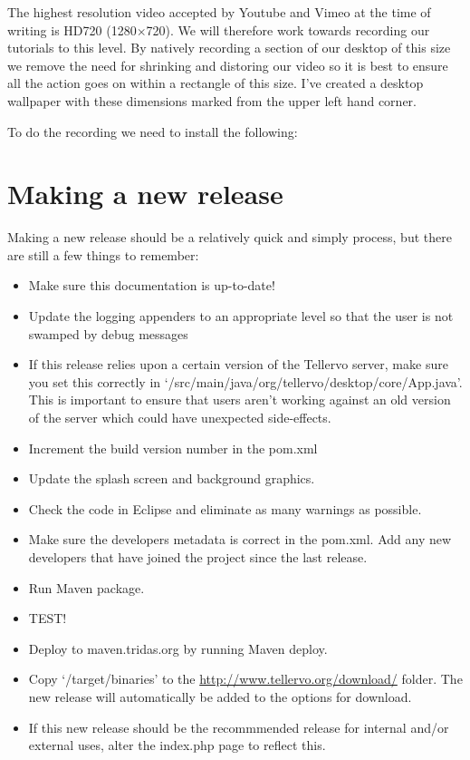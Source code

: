 The highest resolution video accepted by Youtube and Vimeo at the time of writing is HD720 (1280$\times$720).  We will therefore work towards recording our tutorials to this level.  By natively recording a section of our desktop of this size we remove the need for shrinking and distoring our video so it is best to ensure all the action goes on within a rectangle of this size.  I've created a desktop wallpaper with these dimensions marked from the upper left hand corner.  

To do the recording we need to install the following:




\section{Making a new release}
Making a new release should be a relatively quick and simply process, but there are still a few things to remember:

\begin{itemize}
 \item Make sure this documentation is up-to-date!  
 \item Update the logging appenders to an appropriate level so that the user is not swamped by debug messages
 \item If this release relies upon a certain version of the Tellervo server, make sure you set this correctly in `/src/main/java/org/tellervo/desktop/core/App.java'.  This is important to ensure that users aren't working against an old version of the server which could have unexpected side-effects.
 \item Increment the build version number in the pom.xml
 \item Update the splash screen and background graphics.
 \item Check the code in Eclipse and eliminate as many warnings as possible.
 \item Make sure the developers metadata is correct in the pom.xml.  Add any new developers that have joined the project since the last release.
 \item Run Maven package.
 \item TEST!
 \item Deploy to maven.tridas.org by running Maven deploy.
 \item Copy `/target/binaries' to the \url{http://www.tellervo.org/download/} folder.  The new release will automatically be added to the options for download.
 \item If this new release should be the recommmended release for internal and/or external uses, alter the index.php page to reflect this.
\end{itemize}


